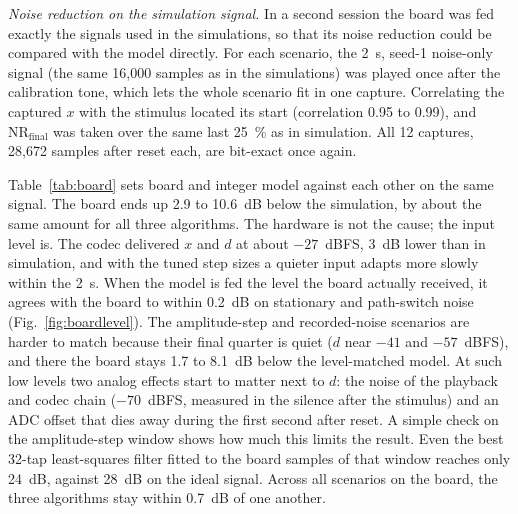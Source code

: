 \emph{Noise reduction on the simulation signal.} In a second session the board was fed exactly the
signals used in the simulations, so that its noise reduction could be compared with the model directly.
For each scenario, the 2~s, seed-1 noise-only signal (the same 16,000 samples as in the simulations) was
played once after the calibration tone, which lets the whole scenario fit in one capture. Correlating the
captured $x$ with the stimulus located its start (correlation 0.95 to 0.99), and
$\mathrm{NR}_\mathrm{final}$ was taken over the same last 25~\% as in simulation. All 12 captures, 28,672
samples after reset each, are bit-exact once again.

Table~\ref{tab:board} sets board and integer model against each other on the same signal. The board ends
up 2.9 to 10.6~dB below the simulation, by about the same amount for all three algorithms. The hardware is
not the cause; the input level is. The codec delivered $x$ and $d$ at about $-27$~dBFS, 3~dB lower than in
simulation, and with the tuned step sizes a quieter input adapts more slowly within the 2~s. When the
model is fed the level the board actually received, it agrees with the board to within 0.2~dB on
stationary and path-switch noise (Fig.~\ref{fig:boardlevel}). The amplitude-step and recorded-noise
scenarios are harder to match because their final quarter is quiet ($d$ near $-41$ and $-57$~dBFS), and
there the board stays 1.7 to 8.1~dB below the level-matched model. At such low levels two analog effects
start to matter next to $d$: the noise of the playback and codec chain ($-70$~dBFS, measured in the
silence after the stimulus) and an ADC offset that dies away during the first second after reset. A
simple check on the amplitude-step window shows how much this limits the result. Even the best 32-tap
least-squares filter fitted to the board samples of that window reaches only 24~dB, against 28~dB on the
ideal signal. Across all scenarios on the board, the three algorithms stay within 0.7~dB of one another.

